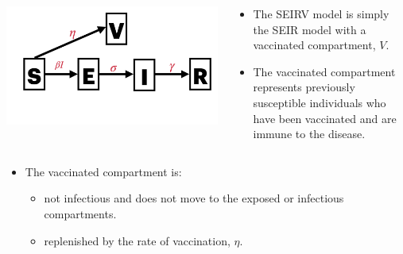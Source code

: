 \documentclass[
  ignorenonframetext,
]{beamer}
\providecommand{\tightlist}{%
  \setlength{\itemsep}{0pt}\setlength{\parskip}{0pt}}\usepackage{longtable,booktabs,array}
\begin{document}
\begin{frame}
\begin{columns}[T]
\begin{column}{0.4\textwidth}
\includegraphics{images/model_diagrams/model_diagrams.010.jpeg}
\end{column}

\begin{column}{0.6\textwidth}
\begin{itemize}
\tightlist
\item
  The SEIRV model is simply the SEIR model with a vaccinated
  compartment, \(V\).
\item
  The vaccinated compartment represents previously susceptible
  individuals who have been vaccinated and are immune to the disease.
\end{itemize}
\end{column}
\end{columns}
\end{frame}

\begin{frame}
\begin{itemize}
\item
  The vaccinated compartment is:

  \begin{itemize}
  \item
    not infectious and does not move to the exposed or infectious
    compartments.
  \item
    replenished by the rate of vaccination, \(\eta\).
  \end{itemize}
\end{itemize}
\end{frame}
\end{document}
